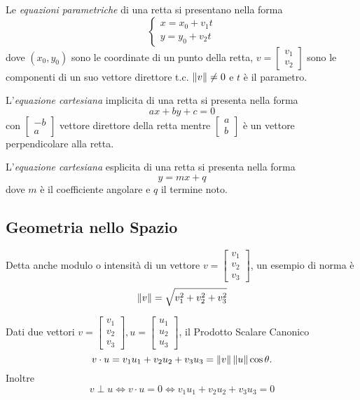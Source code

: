 \begin{appendices}
\par
Le \emph{equazioni parametriche} di una retta si presentano nella forma
\[
	\begin{cases}
		x = x_0 + v_1 t\\
		y = y_0 + v_2 t
	\end{cases}	
\]
dove $ (x_0, y_0) $ sono le coordinate di un punto della retta,
$ v = \begin{bmatrix} v_1 \\ v_2 \end{bmatrix} $ sono le componenti di un suo vettore direttore t.c. $ \left\|v\right\| \neq 0 $ e $t$ è il parametro.

\par
L'\emph{equazione cartesiana} implicita di una retta si presenta nella forma
\[ ax + by + c = 0 \]
con $ \begin{bmatrix} -b \\ a \end{bmatrix} $ vettore direttore della retta
mentre $ \begin{bmatrix} a \\ b \end{bmatrix} $ è un vettore perpendicolare alla retta.

\par
L'\emph{equazione cartesiana} esplicita di una retta si presenta nella forma
\[ y = mx + q \]
dove $m$ è il coefficiente angolare e $q$ il termine noto.

\subsection{Geometria nello Spazio}\label{sect:geom_spazio}
\begin{definition}[Norma]
	Detta anche modulo o intensità di un vettore $ v = \begin{bmatrix} v_1 \\ v_2 \\ v_3 \end{bmatrix} $, un esempio di norma è
	\[ \left\|v\right\| = \sqrt{v_1^2 + v_2^2 + v_3^2} \]
\end{definition}
\begin{definition}
	Dati due vettori $ v = \begin{bmatrix} v_1 \\ v_2 \\ v_3 \end{bmatrix},  u = \begin{bmatrix} u_1 \\ u_2 \\ u_3 \end{bmatrix} $, il Prodotto Scalare Canonico
	\[ v \cdot u = v_1 u_1 + v_2 u_2 + v_3 u_3 = \left\|v\right\| \left\|u\right\| \cos \theta. \]
	Inoltre \[ v \perp u \iff v \cdot u = 0 \iff v_1 u_1 + v_2 u_2 + v_3 u_3 = 0 \]
\end{definition}


\end{appendices}
